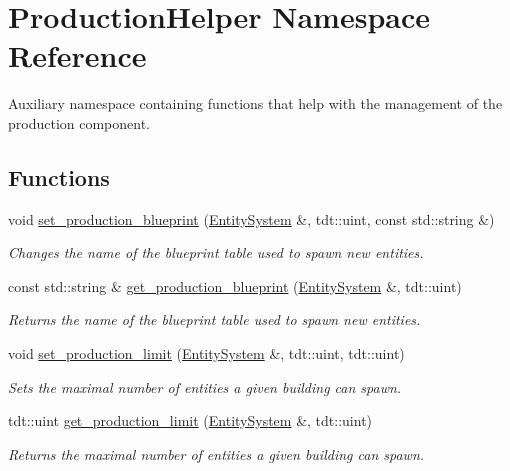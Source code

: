 \hypertarget{namespace_production_helper}{}\section{Production\+Helper Namespace Reference}
\label{namespace_production_helper}


Auxiliary namespace containing functions that help with the management of the production component.  


\subsection*{Functions}
\begin{DoxyCompactItemize}
\item 
void \hyperlink{namespace_production_helper_a22617157d5a3fb4d11a78de10d704ae4}{set\+\_\+production\+\_\+blueprint} (\hyperlink{class_entity_system}{Entity\+System} \&, tdt\+::uint, const std\+::string \&)
\begin{DoxyCompactList}\small\item\em Changes the name of the blueprint table used to spawn new entities. \end{DoxyCompactList}\item 
const std\+::string \& \hyperlink{namespace_production_helper_a99e0cfd050149bcf447ba11712397f6f}{get\+\_\+production\+\_\+blueprint} (\hyperlink{class_entity_system}{Entity\+System} \&, tdt\+::uint)
\begin{DoxyCompactList}\small\item\em Returns the name of the blueprint table used to spawn new entities. \end{DoxyCompactList}\item 
void \hyperlink{namespace_production_helper_a603cec8448338f7afdbf4c1b94a07d23}{set\+\_\+production\+\_\+limit} (\hyperlink{class_entity_system}{Entity\+System} \&, tdt\+::uint, tdt\+::uint)
\begin{DoxyCompactList}\small\item\em Sets the maximal number of entities a given building can spawn. \end{DoxyCompactList}\item 
tdt\+::uint \hyperlink{namespace_production_helper_ab6e57151ca3167293a64b046759f672e}{get\+\_\+production\+\_\+limit} (\hyperlink{class_entity_system}{Entity\+System} \&, tdt\+::uint)
\begin{DoxyCompactList}\small\item\em Returns the maximal number of entities a given building can spawn. \end{DoxyCompactList}\item 

\end{DoxyCompactItemize}
